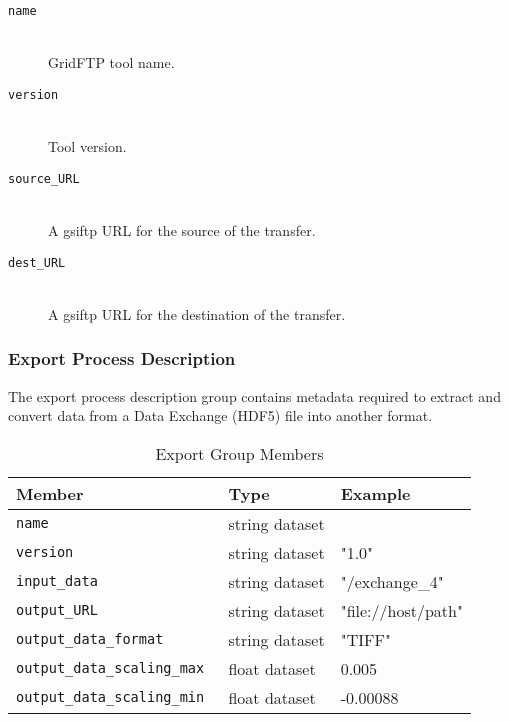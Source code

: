 \begin{description}

\item[\tt{name}] \hfill \\
{GridFTP tool name.}

\item[\tt{version}] \hfill \\
{Tool version.}

\item[\tt{source\_URL}] \hfill \\
{A gsiftp URL for the source of the transfer.}

\item[\tt{dest\_URL}] \hfill \\
{A gsiftp URL for the destination of the transfer.}
\end{description}

\subsubsection{Export Process Description}
\label{table:export}

The export process description group contains metadata required to extract and convert data from a Data Exchange (HDF5) file into another format.

\begin{table}[h!]\sffamily \footnotesize
\caption{Export Group Members}
\centering
{}
\begin{tabular}{l l l}

\toprule
\bfseries Member     & \bfseries Type & \bfseries Example \\
\midrule
\tt{name} & string dataset &  \\  
\tt{version}  & string dataset  & "1.0" \\
\tt{input\_data} &  string dataset & "/exchange\_4" \\
\tt{output\_URL} & string dataset & "file://host/path" \\
\tt{output\_data\_format} & string dataset & "TIFF" \\
\tt{output\_data\_scaling\_max} & float dataset & 0.005 \\
\tt{output\_data\_scaling\_min} & float dataset & -0.00088 \\
\bottomrule
\end{tabular}
\end{table}


